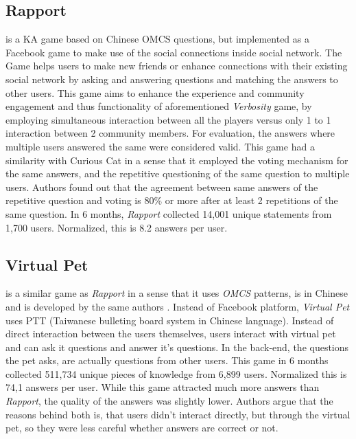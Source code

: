 \subsection{Rapport} is a KA game based on Chinese OMCS questions, but implemented as a 
Facebook game to make use of the social connections inside social network. 
The Game helps users to make new friends or enhance connections with their 
existing social network by asking and answering questions and matching the 
answers to other users\parencite{Kuo2009}. This game aims to enhance the 
experience and community engagement and thus functionality of aforementioned 
\emph{Verbosity} game, by employing simultaneous  interaction between all the 
players versus only 1 to 1 interaction between 2 community members. For 
evaluation, the answers where multiple users answered the same were considered 
valid. This game had a similarity with Curious Cat in a sense that it employed
the voting mechanism for the same answers, and the repetitive questioning of
the same question to multiple users. Authors found out that the agreement 
between same answers of the repetitive question and voting is 80\% or more 
after at least 2 repetitions of the same question. In 6 months, \emph{Rapport}
collected 14,001 unique statements from 1,700 users. Normalized, this is
8.2 answers per user.

\subsection{Virtual Pet} is a similar game as \emph{Rapport} in a sense that it
uses \emph{OMCS} patterns, is in Chinese and is developed by the same authors
\parencite{Kuo2009}. Instead of Facebook platform, \emph{Virtual Pet} uses
PTT (Taiwanese bulleting board system in Chinese language). Instead of direct
interaction between the users themselves, users interact with virtual pet and
can ask it questions and answer it's questions. In the back-end, the questions
the pet asks, are actually questions from other users. This game in 6 months 
collected 511,734 unique pieces of knowledge from 6,899 users. Normalized this
is 74,1 answers per user. While this game attracted much more answers than 
\emph{Rapport}, the quality of the answers was slightly lower. Authors
argue that the reasons behind both is, that users didn't interact directly,
but through the virtual pet, so they were less careful whether answers are
correct or not.

